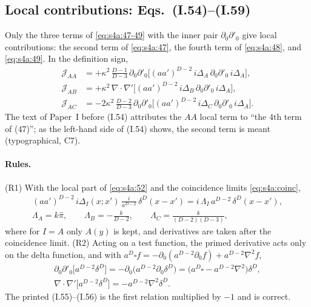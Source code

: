 \documentclass[aps,prd,onecolumn,10pt,nofootinbib,floatfix]{revtex4-2}
\newcommand{\PI}{Paper~I}
\newcommand{\eqI}[1]{(I.#1)}
\newcommand{\pihat}{\hat\pi}
\begin{document}
\subsection{Local contributions: Eqs.~(I.54)--(I.59)}
\label{sec:s4a:local}

Only the three terms of \eqref{eq:s4a:47-49} with the inner pair $\partial_0\partial'_0$ give local
contributions: the second term of \eqref{eq:s4a:47}, the fourth term of \eqref{eq:s4a:48}, and
\eqref{eq:s4a:49}. In the definition sign,
\begin{equation}
\begin{aligned}
\mathcal J_{AA}&=+\kappa^2\,\frac{D-1}{D-3}\,\partial_0\partial'_0\Big[(aa')^{D-2}\,i\Delta_A\,\partial_0\partial'_0\,i\Delta_A\Big],\\
\mathcal J_{AB}&=+\kappa^2\,\nabla\!\cdot\!\nabla'\Big[(aa')^{D-2}\,i\Delta_B\,\partial_0\partial'_0\,i\Delta_A\Big],\\
\mathcal J_{AC}&=-2\kappa^2\,\frac{D-2}{D-3}\,\partial_0\partial'_0\Big[(aa')^{D-2}\,i\Delta_C\,\partial_0\partial'_0\,i\Delta_A\Big].
\end{aligned}
\label{eq:s4a:Jterms}
\end{equation}
The text of \PI{} before \eqI{54} attributes the $AA$ local term to ``the 4th term of (47)''; as the
left-hand side of \eqI{54} shows, the second term is meant (typographical, C7).

\paragraph*{Rules.}
(R1) With the local part of \eqref{eq:s4a:52} and the coincidence limits \eqref{eq:s4a:coinc},
\begin{equation}
\begin{gathered}
(aa')^{D-2}\,i\Delta_I(x;x')\,\frac{i}{a^{D-2}}\,\delta^D(x-x')=i\,\Lambda_I\,a^{D-2}\,\delta^D(x-x'),\\
\Lambda_A=k\pihat,\qquad \Lambda_B=-\frac{k}{D-2},\qquad \Lambda_C=\frac{k}{(D-2)(D-3)},
\end{gathered}
\label{eq:s4a:R1}
\end{equation}
where for $I=A$ only $A(y)$ is kept, and derivatives are taken after the coincidence limit.
(R2) Acting on a test function, the primed derivative acts only on the delta function, and with
$a^D\square f=-\partial_0(a^{D-2}\partial_0f)+a^{D-2}\nabla^2f$,
\begin{equation}
\begin{gathered}
\partial_0\partial'_0\big[a^{D-2}\delta^D\big]=-\partial_0\big(a^{D-2}\partial_0\delta^D\big)=\big(a^D\square-a^{D-2}\nabla^2\big)\delta^D,\\
\nabla\!\cdot\!\nabla'\big[a^{D-2}\delta^D\big]=-a^{D-2}\nabla^2\delta^D .
\end{gathered}
\label{eq:s4a:R2}
\end{equation}
The printed \eqI{55}--\eqI{56} is the first relation multiplied by $-1$ and is correct.
\end{document}
